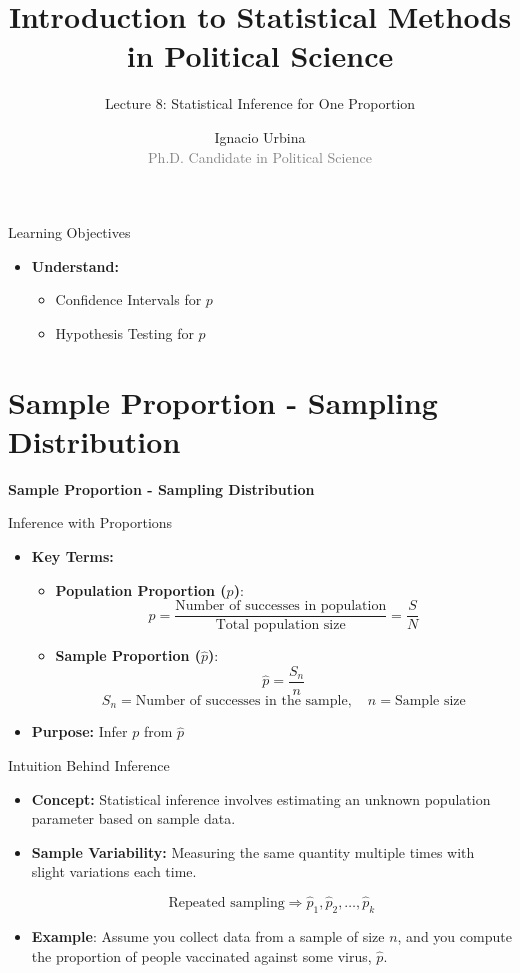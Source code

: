 \documentclass[handout]{beamer} %
\title{Introduction to Statistical Methods in Political Science}
\subtitle{Lecture 8: Statistical Inference for One Proportion}
\author{Ignacio Urbina \texorpdfstring{\\ \vspace{0.3em}}{ } \scriptsize \textcolor{gray}{Ph.D. Candidate in Political Science}}
\date{}
\newcommand{\transitionslide}[1]{
    \begin{frame}[plain]
        \centering
        \vspace{1cm}
        \Huge
        \textcolor{moonstoneblue!150}{\textbf{#1}}
    \end{frame}
}
\begin{document}
\begin{frame}
    \titlepage
\end{frame}

\begin{frame}{Learning Objectives}
    \begin{itemize}
        \item \textbf{Understand:}
        \begin{itemize}
            \item Confidence Intervals for \( p \)
            \item Hypothesis Testing for \( p \)
        \end{itemize}
    \end{itemize}
\end{frame}

\section{Sample Proportion - Sampling Distribution}
\transitionslide{Sample Proportion - Sampling Distribution}

\begin{frame}{Inference with Proportions}
    \begin{itemize}
        \item \textbf{Key Terms:}
        \begin{itemize}
            \item \textbf{Population Proportion (\( p \))}:
            \[
                p = \frac{\text{Number of successes in population}}{\text{Total population size}} = \frac{S}{N}
            \]
            \item \textbf{Sample Proportion (\( \hat{p} \))}:
            \[
                \hat{p} = \frac{S_n}{n}
            \]
            \[
               S_n= \text{Number of successes in the sample}, \quad n = \text{Sample size}
            \]
        \end{itemize}
        \item \textbf{Purpose:} Infer \( p \) from \( \hat{p} \)
    \end{itemize}
\end{frame}

\begin{frame}{Intuition Behind Inference}
    \begin{itemize}
        \item \textbf{Concept:} Statistical inference involves estimating an unknown population parameter based on sample data.
        \item \textbf{Sample Variability:} Measuring the same quantity multiple times with slight variations each time.

    \[
        \text{Repeated sampling} \Rightarrow \hat{p}_1, \hat{p}_2, \ldots, \hat{p}_k
    \]
    \item \textbf{Example}: Assume you collect data from a sample of size $n$, and you compute the proportion of people vaccinated against some virus, $\hat{p}$.
    \end{itemize}
\end{frame}
\end{document}

